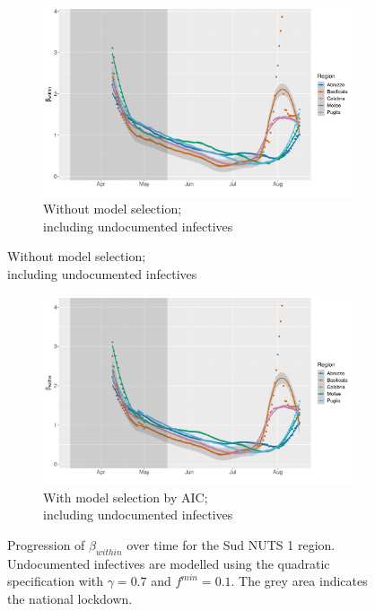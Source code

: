 \documentclass[12pt]{article}
\begin{document}
\begin{appendices}
\begin{figure}[H]
\begin{subfigure}{\textwidth}
    	    \end{subfigure}
    	\end{figure}
        \begin{figure}[H]\ContinuedFloat
    	    \begin{subfigure}{\textwidth}
    	      \centering
    	      \includegraphics[width=0.94\linewidth]{output/model_within_lag14_betawithin_Sud_UndocQuadratic_rollingwindow30.pdf}
    	      \caption{Without model selection; \\ including undocumented infectives}
    	      \label{fig:beta_within_over_time_sud_lowsample_regular_undoc}
    	    \end{subfigure}\newline
        \end{figure}
        \begin{figure}[H]\ContinuedFloat
    	    \begin{subfigure}{\textwidth}
    	      \centering
    	      \includegraphics[width=0.94\linewidth]{output/model_within_lag14_betawithin_Sud_aic_UndocQuadratic_rollingwindow30.pdf}
    	      \caption{With model selection by AIC; \\ including undocumented infectives}
    	      \label{fig:beta_within_over_time_sud_lowsample_aic_undoc}
    	    \end{subfigure}
    	    \caption{Progression of $\beta_{within}$ over time for the Sud NUTS 1 region. Undocumented infectives are modelled using the quadratic specification with $\gamma = 0.7$ and $f^{min}=0.1$. The grey area indicates the national lockdown.}
    	    \label{fig:beta_within_over_time_sud_lowsample}
	    \end{figure}
		

\end{appendices}
\end{document}
